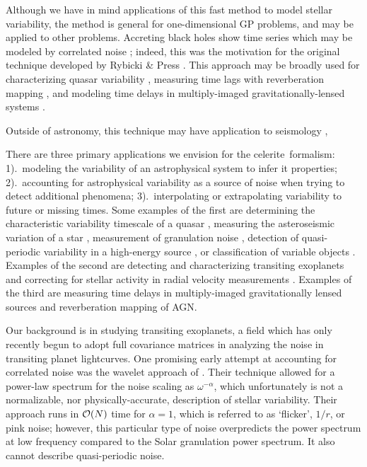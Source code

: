 \documentclass[manuscript, letterpaper]{aastex6}
\makeatletter
\let\origsection\section
\renewcommand\section{\@ifstar{\starsection}{\nostarsection}}
\newcommand\nostarsection[1]{\sectionprelude\origsection{#1}}
\newcommand\starsection[1]{\sectionprelude\origsection*{#1}}
\newcommand\sectionprelude{\vspace{1em}}
\newcommand{\project}[1]{\textsf{#1}}
\newcommand{\celerite}{\project{celerite}}
\makeatother
\begin{document}
\section{Summary}

Although we have in mind applications of this fast method to model stellar
variability, the method is general for one-dimensional GP problems, and may be
applied to other problems.
Accreting black holes show time series which may be modeled by correlated
noise \citep{Kelly:2014};  indeed, this was the motivation for the original
technique developed by Rybicki \& Press \citep{Rybicki:1992,Rybicki:1995}.
This approach may be broadly used for characterizing quasar variability
\citep{MacLeod:2010}, measuring time lags with reverberation mapping
\citep{Zu:2011,Pancoast:2014}, and modeling time delays in multiply-imaged
gravitationally-lensed systems \citep{Press:1998}.

Outside of astronomy, this technique may have application to seismology
\citep{Robinson:1967},

There are three primary applications we envision for the \celerite\ formalism:
1).\ modeling the variability of an astrophysical system to infer it
properties; 2).\ accounting for astrophysical variability as a source of noise
when trying to detect additional phenomena; 3).\ interpolating or
extrapolating variability to future or missing times.
Some examples of the first are determining the characteristic variability
timescale of a quasar \citep{Kelly:2014}, measuring the asteroseismic
variation of a star \citep{Brewer:2009,Corsaro:2014}, measurement of
granulation noise \citep{Bastien:2013,Kallinger:2016}, detection of
quasi-periodic variability in a high-energy source \citep{McAllister:2016}, or
classification of variable objects \citep{Zinn:2016}.
Examples of the second are detecting and characterizing transiting exoplanets
\citep[for example,][]{Gibson:2012, Barclay:2015, Evans:2015, Aigrain:2016,
Grunblatt:2016, Luger:2016}
and correcting for stellar activity in radial velocity measurements
\citep[for example,][]{Haywood:2014, Rajpaul:2015}.
Examples of the third are measuring time delays in multiply-imaged
gravitationally lensed sources \citep{Tewes:2013} and reverberation mapping of
AGN.

Our background is in studying transiting exoplanets, a field which has only
recently begun to adopt full covariance matrices in analyzing the noise in
transiting planet lightcurves.
One promising early attempt at accounting for correlated noise was the wavelet
approach of \citet{Carter:2009}.
Their technique allowed for a power-law spectrum for the noise scaling as
$\omega^{-\alpha}$, which unfortunately is not a normalizable, nor
physically-accurate, description of stellar variability.
Their approach runs in ${\cal O}(N)$ time for $\alpha=1$, which is referred to
as `flicker', $1/r$, or pink noise;  however, this particular type of noise
overpredicts the power spectrum at low frequency compared to the Solar
granulation power spectrum.
It also cannot describe quasi-periodic noise.
\end{document}
